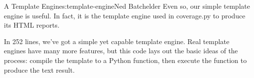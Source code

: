 \begin{aosachapter}{A Template Engine}{s:template-engine}{Ned Batchelder}
Even so, our simple template engine is useful. In fact, it is the
template engine used in coverage.py to produce its HTML reports.

\label{summing-up}

In 252 lines, we've got a simple yet capable template engine. Real
template engines have many more features, but this code lays out the
basic ideas of the process: compile the template to a Python function,
then execute the function to produce the text result.

\end{aosachapter}
